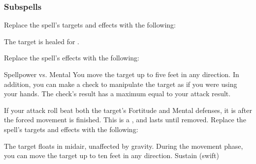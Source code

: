 \subsubsection{Subspells}
Replace the spell's targets and effects with the following:
\begin{spellcontent}
\begin{augmenttargetinginfo}
\end{augmenttargetinginfo}
\begin{augmenteffects}
\spelleffect
The target is healed for \spelldamage{}.
\end{augmenteffects}
\end{spellcontent}
Replace the spell's effects with the following:
\begin{spellcontent}
\begin{augmenteffects}
\begin{spellattack}{Spellpower vs. Mental}
\spellsuccess
You move the target up to five feet in any direction.
In addition, you can make a check to manipulate the target as if you were using your hands.
The check's result has a maximum equal to your attack result.
\end{spellattack}
\end{augmenteffects}
\end{spellcontent}
If your attack roll beat both the target's Fortitude and Mental defenses, it is \immobilized after the forced movement is finished.
This is a , and lasts until removed.
Replace the spell's targets and effects with the following:
\begin{spellcontent}
\begin{augmenttargetinginfo}
\end{augmenttargetinginfo}
\begin{augmenteffects}
\spelleffect
The target floats in midair, unaffected by gravity.
During the movement phase, you can move the target up to ten feet in any direction.
\spelldur Sustain (swift)
\end{augmenteffects}
\end{spellcontent}
